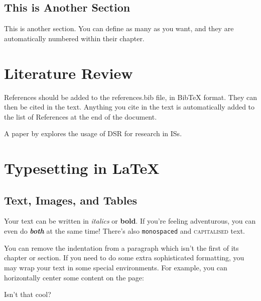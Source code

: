 \documentclass{dissertation}
\begin{document}
\section{This is Another Section}

This is another section. You can define as many as you want, and they are automatically numbered within their chapter.










\chapter{Literature Review}\label{ch:literature_review}

References should be added to the references.bib file, in BibTeX format. They can then be cited in the text. Anything you cite in the text is automatically added to the list of References at the end of the document.

A paper by \textcite{Peffers2007} explores the usage of \ac{DSR} for research in \acp{IS}.










\chapter{Typesetting in \LaTeX}\label{ch:typesetting}

\section{Text, Images, and Tables}\label{sec:text_images_tables}

Your text can be written in \textit{italics} or \textbf{bold}. If you're feeling adventurous, you can even do \textit{\textbf{both}} at the same time! There's also \texttt{monospaced} and \textsc{capitalised} text.

\noindent You can remove the indentation from a paragraph which isn't the first of its chapter or section. If you need to do some extra sophisticated formatting, you may wrap your text in some special environments. For example, you can horizontally center some content on the page:
\begin{center}
    Isn't that cool?
\end{center}
\end{document}
